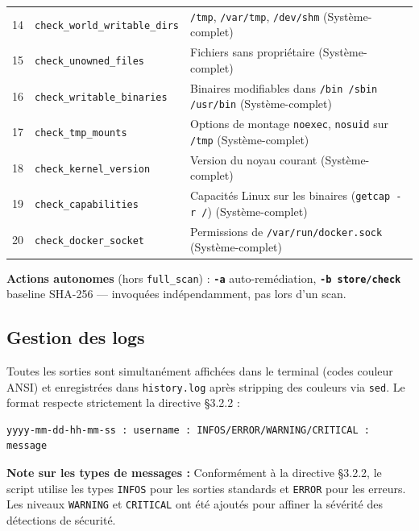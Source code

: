 \documentclass[12pt,a4paper]{article}
\newcommand{\opt}[1]{\texttt{\textcolor{bleuMed}{\textbf{#1}}}}
\newcommand{\cmd}[1]{\texttt{\textcolor{codeText}{#1}}}
\newcommand{\fichier}[1]{\texttt{\textcolor{bleuENSET}{#1}}}
\begin{document}
\begin{longtable}{C{0.7cm} L{3.8cm} L{9.3cm}}
  14 & \cmd{check\_world\_writable\_dirs} & \fichier{/tmp}, \fichier{/var/tmp}, \fichier{/dev/shm} (Système-complet) \\
  15 & \cmd{check\_unowned\_files}    & Fichiers sans propriétaire (Système-complet) \\
  16 & \cmd{check\_writable\_binaries}& Binaires modifiables dans \fichier{/bin /sbin /usr/bin} (Système-complet) \\
  17 & \cmd{check\_tmp\_mounts}       & Options de montage \cmd{noexec}, \cmd{nosuid} sur \fichier{/tmp} (Système-complet) \\
  18 & \cmd{check\_kernel\_version}   & Version du noyau courant (Système-complet) \\
  19 & \cmd{check\_capabilities}      & Capacités Linux sur les binaires (\cmd{getcap -r /}) (Système-complet) \\
  20 & \cmd{check\_docker\_socket}    & Permissions de \fichier{/var/run/docker.sock} (Système-complet) \\
\end{longtable}

\begin{infobox}
\textbf{Actions autonomes} (hors \cmd{full\_scan}) : \opt{-a} auto-remédiation, \opt{-b store/check} baseline SHA-256 --- invoquées indépendamment, pas lors d'un scan.
\end{infobox}

\subsection{Gestion des logs}

Toutes les sorties sont simultanément affichées dans le terminal (codes couleur ANSI) et enregistrées dans \fichier{history.log} après stripping des couleurs via \cmd{sed}. Le format respecte strictement la directive \S{}3.2.2 :

\begin{lstlisting}[style=bash]
yyyy-mm-dd-hh-mm-ss : username : INFOS/ERROR/WARNING/CRITICAL : message
\end{lstlisting}

\textbf{Note sur les types de messages :} Conformément à la directive \S{}3.2.2, le script utilise les types \texttt{INFOS} pour les sorties standards et \texttt{ERROR} pour les erreurs. Les niveaux \texttt{WARNING} et \texttt{CRITICAL} ont été ajoutés pour affiner la sévérité des détections de sécurité.
\end{document}
